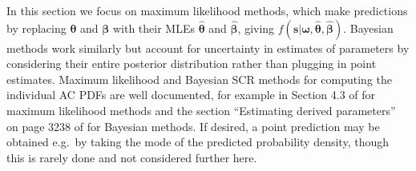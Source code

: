 \documentclass[useAMS,usenatbib,referee]{biom}
\begin{document}


In this section we focus on maximum likelihood methods, which make predictions by replacing $\bm{\theta}$ and $\bm{\beta}$ with their MLEs $\hat{\bm{\theta}}$ and $\hat{\bm{\beta}}$, giving $f(\bm{s}|\bm{\omega},\hat{\bm{\theta}},\hat{\bm{\beta}})$. Bayesian methods work similarly but account for uncertainty in estimates of parameters by considering their entire posterior distribution rather than plugging in point estimates. Maximum likelihood and Bayesian SCR methods for computing the individual AC PDFs are well documented, for example in Section 4.3 of \cite{Borchers+Efford:08} for maximum likelihood methods and the section ``Estimating derived parameters'' on page 3238 of \cite{Royle+al:09b} for Bayesian methods. If desired, a point prediction may be obtained e.g.\ by taking the mode of the predicted probability density, though this is rarely done and not considered further here.
\end{document}
